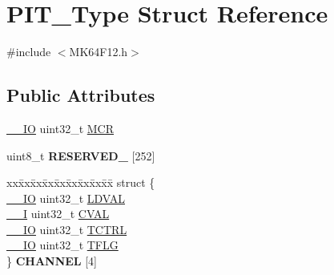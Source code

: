 \hypertarget{structPIT__Type}{}\section{P\+I\+T\+\_\+\+Type Struct Reference}
\label{structPIT__Type}


{\ttfamily \#include $<$M\+K64\+F12.\+h$>$}

\subsection*{Public Attributes}
\begin{DoxyCompactItemize}
\item 
\hyperlink{core__sc300_8h_aec43007d9998a0a0e01faede4133d6be}{\+\_\+\+\_\+\+IO} uint32\+\_\+t \hyperlink{structPIT__Type_ac2befe5f01ae11bccda33a84cff453b0}{M\+CR}
\item 
uint8\+\_\+t {\bfseries R\+E\+S\+E\+R\+V\+E\+D\+\_} \mbox{[}252\mbox{]}\hypertarget{structPIT__Type_a55f315f19140ddcba279295401865e77}{}\label{structPIT__Type_a55f315f19140ddcba279295401865e77}

\item 
\begin{tabbing}
xx\=xx\=xx\=xx\=xx\=xx\=xx\=xx\=xx\=\kill
struct \{\\
\>\hyperlink{core__sc300_8h_aec43007d9998a0a0e01faede4133d6be}{\_\_IO} uint32\_t \hyperlink{structPIT__Type_a6880c80d3b65e0e5831b72371f607224}{LDVAL}\\
\>\hyperlink{core__sc300_8h_af63697ed9952cc71e1225efe205f6cd3}{\_\_I} uint32\_t \hyperlink{structPIT__Type_af98efdc8f0866cbaa72e83cfa391cac9}{CVAL}\\
\>\hyperlink{core__sc300_8h_aec43007d9998a0a0e01faede4133d6be}{\_\_IO} uint32\_t \hyperlink{structPIT__Type_a1efb9476e302dfe00faf684173c5b6ea}{TCTRL}\\
\>\hyperlink{core__sc300_8h_aec43007d9998a0a0e01faede4133d6be}{\_\_IO} uint32\_t \hyperlink{structPIT__Type_af54765dd193a93cd7bddf1eb6b0c30fa}{TFLG}\\
\} {\bfseries CHANNEL} \mbox{[}4\mbox{]}\hypertarget{structPIT__Type_ac46a1d3c2731e368949a5a95b621750c}{}\label{structPIT__Type_ac46a1d3c2731e368949a5a95b621750c}
\\


\end{tabbing}
\end{DoxyCompactItemize}
